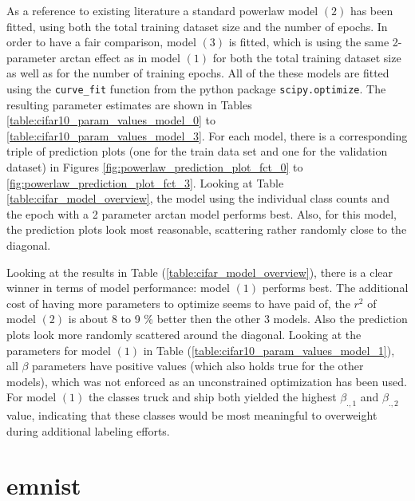 \documentclass{article} %
\begin{document}
As a reference to existing literature a standard powerlaw model $(2)$ has been fitted, using both the total training dataset size and the number of epochs.
In order to have a fair comparison, model $(3)$ is fitted, which is using the same 2-parameter arctan effect as in model $(1)$ for both the total training dataset size as well as for the number of training epochs.
All of the these models are fitted using the \verb|curve_fit| function from the python package \verb|scipy.optimize|.
The resulting parameter estimates are shown in Tables \ref{table:cifar10_param_values_model_0} to \ref{table:cifar10_param_values_model_3}.
For each model, there is a corresponding triple of prediction plots (one for the train data set and one for the validation dataset) in Figures \ref{fig:powerlaw_prediction_plot_fct_0} to \ref{fig:powerlaw_prediction_plot_fct_3}.
Looking at Table \ref{table:cifar_model_overview}, the model using the individual class counts and the epoch with a 2 parameter arctan model performs best. 
Also, for this model, the prediction plots look most reasonable, scattering rather randomly close to the diagonal.


Looking at the results in Table (\ref{table:cifar_model_overview}), there is a clear winner in terms of model performance: model $(1)$ performs best.
The additional cost of having more parameters to optimize seems to have paid of, the $r^2$ of model $(2)$ is about 8 to 9 \% better then the other 3 models.
Also the prediction plots look more randomly scattered around the diagonal.
Looking at the parameters for model $(1)$ in Table (\ref{table:cifar10_param_values_model_1}), all $\beta$ parameters have positive values (which also holds true for the other models), which was not enforced as an unconstrained optimization has been used.
For model $(1)$ the classes truck and ship both yielded the highest $\beta_{.,1}$ and $\beta_{.,2}$ value, indicating that these classes would be most meaningful to overweight during additional labeling efforts.


\section{emnist}
\end{document}

